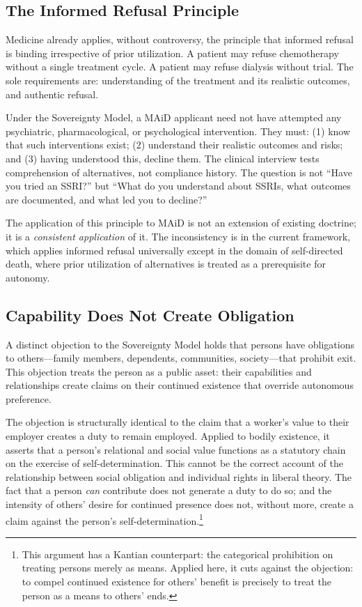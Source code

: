 \documentclass[11pt, letterpaper]{article}
\begin{document}
\subsection{The Informed Refusal Principle}

Medicine already applies, without controversy, the principle that informed refusal is
binding irrespective of prior utilization. A patient may refuse chemotherapy without
a single treatment cycle. A patient may refuse dialysis without trial. The sole
requirements are: understanding of the treatment and its realistic outcomes, and
authentic refusal.

\begin{policybox}[title={\sffamily\bfseries\small\color{C@accent}
  The Informed Refusal Standard Applied to MAiD}]
Under the Sovereignty Model, a MAiD applicant need not have attempted any psychiatric,
pharmacological, or psychological intervention. They must: (1) know that such
interventions exist; (2) understand their realistic outcomes and risks; and
(3) having understood this, decline them. The clinical interview tests comprehension
of alternatives, not compliance history. The question is not ``Have you tried an
SSRI?'' but ``What do you understand about SSRIs, what outcomes are documented, and
what led you to decline?''
\end{policybox}

The application of this principle to MAiD is not an extension of existing doctrine;
it is a \textit{consistent application} of it. The inconsistency is in the current
framework, which applies informed refusal universally except in the domain of
self-directed death, where prior utilization of alternatives is treated as a
prerequisite for autonomy.

\subsection{Capability Does Not Create Obligation}

A distinct objection to the Sovereignty Model holds that persons have obligations to
others---family members, dependents, communities, society---that prohibit exit. This
objection treats the person as a public asset: their capabilities and relationships
create claims on their continued existence that override autonomous preference.

The objection is structurally identical to the claim that a worker's value to their
employer creates a duty to remain employed. Applied to bodily existence, it asserts
that a person's relational and social value functions as a statutory chain on the
exercise of self-determination. This cannot be the correct account of the relationship
between social obligation and individual rights in liberal theory. The fact that a
person \textit{can} contribute does not generate a duty to do so; and the intensity
of others' desire for continued presence does not, without more, create a claim against
the person's self-determination.\footnote{%
  This argument has a Kantian counterpart: the categorical prohibition on treating
  persons merely as means. Applied here, it cuts against the objection: to compel
  continued existence for others' benefit is precisely to treat the person as a means
  to others' ends.}
\end{document}
